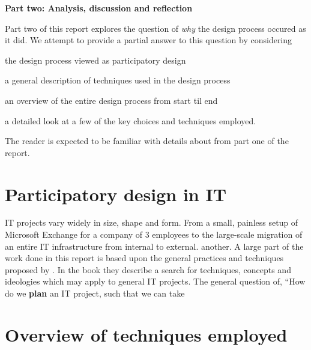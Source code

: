 \setcounter{section}{0}
\setcounter{figure}{0}
\setcounter{table}{0}
\textbf{\LARGE{{Part two: Analysis, discussion and reflection}}}\\


Part two of this report explores the question of \textit{why}
the design process occured as it did. We attempt to provide a
partial answer to this question by considering
\begin{inparaenum}[1)]
\item the design process viewed as participatory design
\item a general description of techniques used in the design process
\item an overview of the entire design process from start til end
\item a detailed look at a few of the key choices and techniques employed.
\end{inparaenum}

The reader is expected to be familiar with details about \gomonkey{} 
from part one of the report.

\section{Participatory design in IT}
IT projects vary widely in size, shape and form. From a small, painless
setup of Microsoft Exchange for a company of 3 employees to the large-scale
migration of an entire IT infrastructure from internal to external.
another.
A large part of the work done in this report is based upon the general
practices and techniques proposed by \cite{bodker2004participatory}. In the
book they describe a search for techniques, concepts and ideologies which
may apply to general IT projects. 
The general question of, ``How do we \textbf{plan} an IT project, such
that we can take 

\section{Overview of techniques employed}

